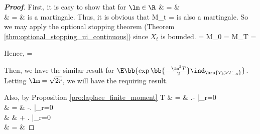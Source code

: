 \begin{proof}[\bf Proof]
First, it is easy to show that for $\lm \in \R$
\beast
\exp{}
& = & \exp{} \\
& = & \exp{}
\eeast
is a martingale. Thus, it is obvious that
\be
M_t = \exp{} \sinh{}
\ee
is also a martingale. So we may apply the optional stopping theorem (Theorem \ref{thm:optional_stopping_ui_continuous}) since $X_t$ is bounded.
\beast
\sinh{} = M_0 = \E M_T = \E{}
\eeast

Hence,
\be
\E{} = 
\ee

Then, we have the similar result for $\E\bb{\exp\bb{-\frac{\lm^2 T}{2}} \ind_{\bra{T_{b}>T_{-a}}}}$. Letting $\lm = \sqrt{2r}$, we will have the requiring result.

Also, by Proposition \ref{pro:laplace_finite_moment}%
\beast
\E T & = & \left.- \right|_{r=0} \\
& = & -\left. \right|_{r=0} \\
& & + \left. \right|_{r=0} \\
& = & 
\eeast


\end{proof}
